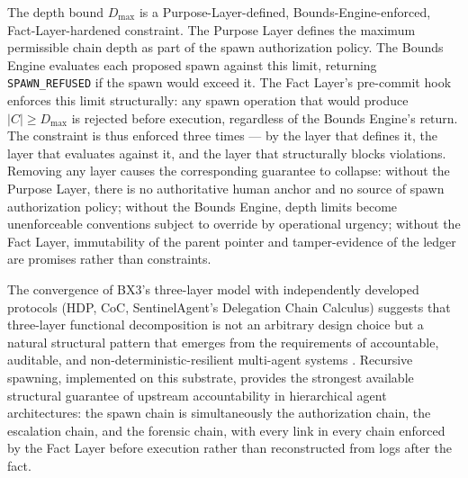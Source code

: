 The depth bound $D_{\max}$ is a Purpose-Layer-defined, Bounds-Engine-enforced, Fact-Layer-hardened constraint. The Purpose Layer defines the maximum permissible chain depth as part of the spawn authorization policy. The Bounds Engine evaluates each proposed spawn against this limit, returning \texttt{SPAWN\_REFUSED} if the spawn would exceed it. The Fact Layer's pre-commit hook enforces this limit structurally: any spawn operation that would produce $|C| \geq D_{\max}$ is rejected before execution, regardless of the Bounds Engine's return. The constraint is thus enforced three times — by the layer that defines it, the layer that evaluates against it, and the layer that structurally blocks violations. Removing any layer causes the corresponding guarantee to collapse: without the Purpose Layer, there is no authoritative human anchor and no source of spawn authorization policy; without the Bounds Engine, depth limits become unenforceable conventions subject to override by operational urgency; without the Fact Layer, immutability of the parent pointer and tamper-evidence of the ledger are promises rather than constraints.

The convergence of BX3's three-layer model with independently developed protocols (HDP, CoC, SentinelAgent's Delegation Chain Calculus) suggests that three-layer functional decomposition is not an arbitrary design choice but a natural structural pattern that emerges from the requirements of accountable, auditable, and non-deterministic-resilient multi-agent systems \cite{hdp2026,chainofconsciousness2026,sentinelagent2025}. Recursive spawning, implemented on this substrate, provides the strongest available structural guarantee of upstream accountability in hierarchical agent architectures: the spawn chain is simultaneously the authorization chain, the escalation chain, and the forensic chain, with every link in every chain enforced by the Fact Layer before execution rather than reconstructed from logs after the fact.

